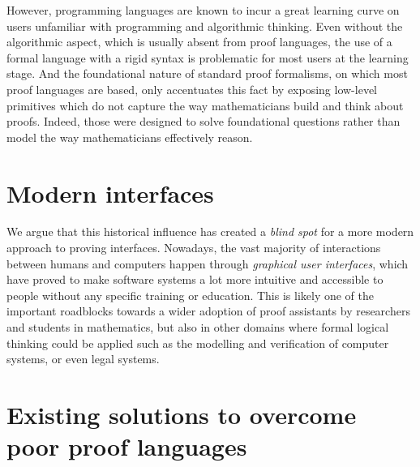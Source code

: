 However, programming languages are known to incur a great learning curve on
users unfamiliar with programming and algorithmic thinking. Even without the
algorithmic aspect, which is usually absent from proof languages, the use of a
formal language with a rigid syntax is problematic for most users at the
learning stage. And the foundational nature of standard proof formalisms, on
which most proof languages are based, only accentuates this fact by exposing
low-level primitives which do not capture the way mathematicians build and think
about proofs. Indeed, those were designed to solve foundational
questions rather than model the way mathematicians
effectively reason.

\section{Modern interfaces}

We argue that this historical influence has created a \emph{blind spot} for a
more modern approach to proving interfaces. Nowadays, the vast majority of
interactions between humans and computers happen through \emph{graphical user
interfaces}, which have proved to make software systems a lot more intuitive and
accessible to people without any specific training or education. This is likely
one of the important roadblocks towards a wider adoption of proof assistants by
researchers and students in mathematics, but also in other domains where formal
logical thinking could be applied such as the modelling and verification of
computer systems, or even legal systems.

\section{Existing solutions to overcome poor proof languages}

